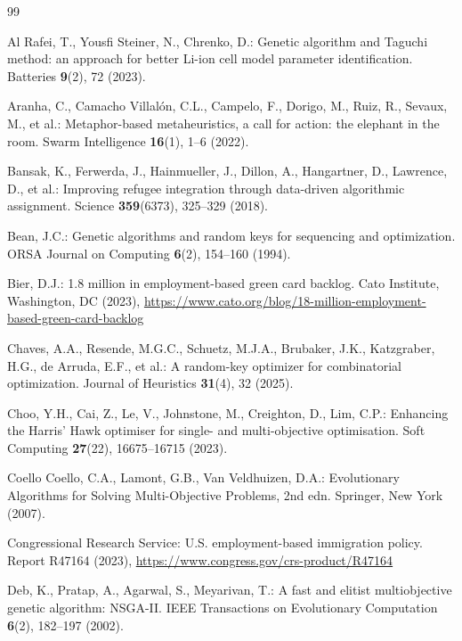 \documentclass[runningheads]{llncs}
\begin{document}
\begin{thebibliography}{99}

Al Rafei, T., Yousfi Steiner, N., Chrenko, D.: Genetic algorithm and Taguchi method: an approach for better Li-ion cell model parameter identification. Batteries \textbf{9}(2), 72 (2023). 

Aranha, C., Camacho Villal\'on, C.L., Campelo, F., Dorigo, M., Ruiz, R., Sevaux, M., et al.: Metaphor-based metaheuristics, a call for action: the elephant in the room. Swarm Intelligence \textbf{16}(1), 1--6 (2022). 

Bansak, K., Ferwerda, J., Hainmueller, J., Dillon, A., Hangartner, D., Lawrence, D., et al.: Improving refugee integration through data-driven algorithmic assignment. Science \textbf{359}(6373), 325--329 (2018). 

Bean, J.C.: Genetic algorithms and random keys for sequencing and optimization. ORSA Journal on Computing \textbf{6}(2), 154--160 (1994). 

Bier, D.J.: 1.8 million in employment-based green card backlog. Cato Institute, Washington, DC (2023), \url{https://www.cato.org/blog/18-million-employment-based-green-card-backlog}

Chaves, A.A., Resende, M.G.C., Schuetz, M.J.A., Brubaker, J.K., Katzgraber, H.G., de Arruda, E.F., et al.: A random-key optimizer for combinatorial optimization. Journal of Heuristics \textbf{31}(4), 32 (2025). 

Choo, Y.H., Cai, Z., Le, V., Johnstone, M., Creighton, D., Lim, C.P.: Enhancing the Harris' Hawk optimiser for single- and multi-objective optimisation. Soft Computing \textbf{27}(22), 16675--16715 (2023). 

Coello Coello, C.A., Lamont, G.B., Van Veldhuizen, D.A.: Evolutionary Algorithms for Solving Multi-Objective Problems, 2nd edn. Springer, New York (2007). 

Congressional Research Service: U.S. employment-based immigration policy. Report R47164 (2023), \url{https://www.congress.gov/crs-product/R47164}

Deb, K., Pratap, A., Agarwal, S., Meyarivan, T.: A fast and elitist multiobjective genetic algorithm: NSGA-II. IEEE Transactions on Evolutionary Computation \textbf{6}(2), 182--197 (2002). 


\end{thebibliography}
\end{document}
